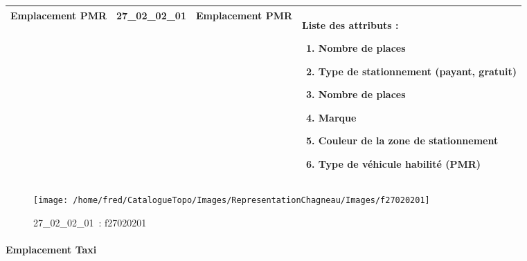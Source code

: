 \documentclass[12pt,titlepage]{book}
\begin{document}
\renewcommand{\arraystretch}{1.2}
\begin{supertabular}{|p{10cm}|c|p{13cm}|p{12cm}|}
 Emplacement PMR & 27\_02\_02\_01 & Emplacement PMR & Liste des attributs :
\begin{enumerate}
  \item Nombre de places  \item Type de stationnement (payant, gratuit)  \item Nombre de places  \item Marque  \item Couleur de la zone de stationnement  \item Type de véhicule habilité (PMR)\end{enumerate}
\\
\hline
\end{supertabular}
\begin{figure}[h!]
  \hfill         %
  \begin{minipage}[t]{3cm}
    \begin{center}
      \texttt{[image: /home/fred/CatalogueTopo/Images/RepresentationChagneau/Images/f27020201]}
      \caption[~27\_02\_02\_01]{\small{27\_02\_02\_01~:} \tiny{f27020201}}\label{f27020201}
    \end{center}
  \end{minipage}
\end{figure}


\paragraph{Emplacement Taxi}
\noindent
\vspace{\baselineskip}
\end{document}
